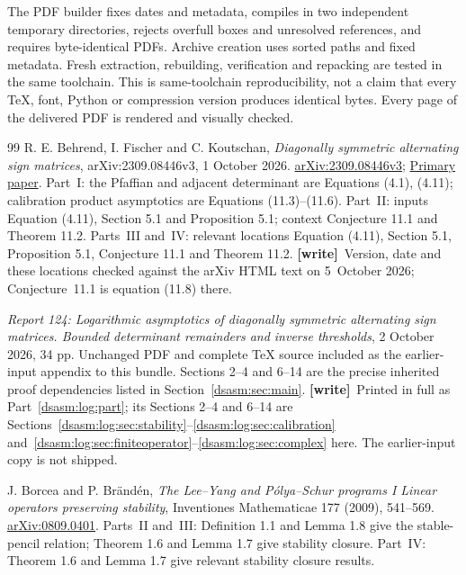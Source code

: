 \documentclass[11pt,letterpaper]{article}
\theoremstyle{remark}\newtheorem{remark}[theorem]{Remark}
\newcommand{\wtag}{\textup{\textbf{[write]}}}
\begin{document}
The PDF builder fixes dates and metadata, compiles in two independent
temporary directories, rejects overfull boxes and unresolved
references, and requires byte-identical PDFs. Archive creation uses
sorted paths and fixed metadata. Fresh extraction, rebuilding,
verification and repacking are tested in the same toolchain. This is
same-toolchain reproducibility, not a claim that every TeX, font,
Python or compression version produces identical bytes. Every page
of the delivered PDF is rendered and visually checked.
\clearpage
\begingroup\small
\begin{thebibliography}{99}
R. E. Behrend, I. Fischer and C. Koutschan,
\emph{Diagonally symmetric alternating sign matrices},
arXiv:2309.08446v3, 1 October 2026.
\href{https://arxiv.org/abs/2309.08446v3}{arXiv:2309.08446v3};
\href{https://arxiv.org/html/2309.08446v3}{Primary paper}.
Part~I: the Pfaffian and adjacent determinant are Equations (4.1), (4.11);
calibration product asymptotics are Equations (11.3)--(11.6).
Part~II: inputs Equation (4.11), Section 5.1 and Proposition 5.1;
context Conjecture 11.1 and Theorem 11.2.
Parts~III and~IV: relevant locations Equation (4.11), Section 5.1,
Proposition 5.1, Conjecture 11.1 and Theorem 11.2.
\wtag\ Version, date and these locations checked against the arXiv HTML text on 5~October 2026; Conjecture~11.1 is equation (11.8) there.

\emph{Report 124: Logarithmic asymptotics of diagonally symmetric
alternating sign matrices. Bounded determinant remainders and inverse
thresholds}, 2 October 2026, 34 pp.
Unchanged PDF and complete TeX source included as the earlier-input
appendix to this bundle. Sections 2--4 and 6--14 are the precise
inherited proof dependencies listed in Section~\ref{dsasm:sec:main}.
\wtag\ Printed in full as Part~\ref{dsasm:log:part}; its Sections 2--4 and 6--14 are Sections~\ref{dsasm:log:sec:stability}--\ref{dsasm:log:sec:calibration} and~\ref{dsasm:log:sec:finiteoperator}--\ref{dsasm:log:sec:complex} here. The earlier-input copy is not shipped.

J. Borcea and P. Br\"and\'en,
\emph{The Lee--Yang and P\'olya--Schur programs I
Linear operators preserving stability},
Inventiones Mathematicae 177 (2009), 541--569.
\href{https://arxiv.org/abs/0809.0401}{arXiv:0809.0401}.
Parts~II and~III: Definition 1.1 and Lemma 1.8 give the stable-pencil relation;
Theorem 1.6 and Lemma 1.7 give stability closure.
Part~IV: Theorem 1.6 and Lemma 1.7 give relevant stability closure results.


\end{thebibliography}
\end{document}
